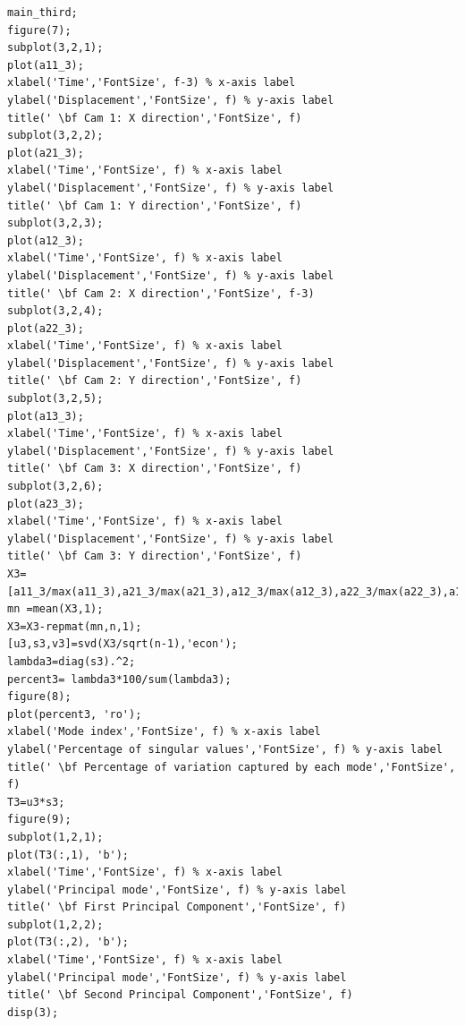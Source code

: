 \documentclass[a4paper]{article}
\begin{document}
\begin{lstlisting}[style=myMatlabstyle]
main_third;
figure(7);
subplot(3,2,1);
plot(a11_3);
xlabel('Time','FontSize', f-3) % x-axis label
ylabel('Displacement','FontSize', f) % y-axis label
title(' \bf Cam 1: X direction','FontSize', f)
subplot(3,2,2);
plot(a21_3);
xlabel('Time','FontSize', f) % x-axis label
ylabel('Displacement','FontSize', f) % y-axis label
title(' \bf Cam 1: Y direction','FontSize', f)
subplot(3,2,3);
plot(a12_3);
xlabel('Time','FontSize', f) % x-axis label
ylabel('Displacement','FontSize', f) % y-axis label
title(' \bf Cam 2: X direction','FontSize', f-3)
subplot(3,2,4);
plot(a22_3);
xlabel('Time','FontSize', f) % x-axis label
ylabel('Displacement','FontSize', f) % y-axis label
title(' \bf Cam 2: Y direction','FontSize', f)
subplot(3,2,5);
plot(a13_3);
xlabel('Time','FontSize', f) % x-axis label
ylabel('Displacement','FontSize', f) % y-axis label
title(' \bf Cam 3: X direction','FontSize', f)
subplot(3,2,6);
plot(a23_3);
xlabel('Time','FontSize', f) % x-axis label
ylabel('Displacement','FontSize', f) % y-axis label
title(' \bf Cam 3: Y direction','FontSize', f)
X3=[a11_3/max(a11_3),a21_3/max(a21_3),a12_3/max(a12_3),a22_3/max(a22_3),a13_3/max(a13_3),a23_3/max(a23_3)];
mn =mean(X3,1);
X3=X3-repmat(mn,n,1);
[u3,s3,v3]=svd(X3/sqrt(n-1),'econ');
lambda3=diag(s3).^2;
percent3= lambda3*100/sum(lambda3);
figure(8);
plot(percent3, 'ro');
xlabel('Mode index','FontSize', f) % x-axis label
ylabel('Percentage of singular values','FontSize', f) % y-axis label
title(' \bf Percentage of variation captured by each mode','FontSize', f)
T3=u3*s3;
figure(9);
subplot(1,2,1);
plot(T3(:,1), 'b');
xlabel('Time','FontSize', f) % x-axis label
ylabel('Principal mode','FontSize', f) % y-axis label
title(' \bf First Principal Component','FontSize', f)
subplot(1,2,2);
plot(T3(:,2), 'b');
xlabel('Time','FontSize', f) % x-axis label
ylabel('Principal mode','FontSize', f) % y-axis label
title(' \bf Second Principal Component','FontSize', f)
disp(3);



\end{lstlisting}
\end{document}
